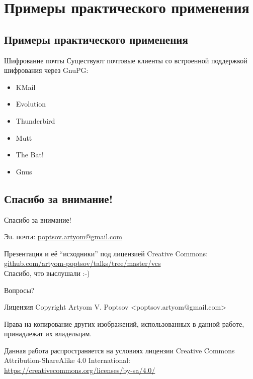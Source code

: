 \documentclass[presentation]{beamer}
\begin{document}

\section{Примеры практического применения}

\subsection{Примеры практического применения}

\begin{frame}[fragile]{Шифрование почты}
  Существуют почтовые клиенты со встроенной поддержкой шифрования
  через GnuPG:
  \begin{itemize}
  \item KMail
  \item Evolution
  \item Thunderbird
  \item Mutt
  \item The Bat!
  \item Gnus
  \end{itemize}
\end{frame}




\subsection{Спасибо за внимание!}

\begin{frame}{Спасибо за внимание!}
  \large

  Эл. почта: \url{poptsov.artyom@gmail.com}

  \medskip

  Презентация и её ``исходники'' под лицензией Creative Commons:
  \url{github.com/artyom-poptsov/talks/tree/master/vcs} \\[10pt]

  Спасибо, что выслушали  :-) \\[30pt]

  \bigskip

  \huge Вопросы?
\end{frame}

\begin{frame}{Лицензия}
  Copyright  Artyom V. Poptsov
  <poptsov.artyom@gmail.com> \newline

  Права на копирование других изображений, использованных в данной
  работе, принадлежат их владельцам. \newline

  Данная работа распространяется на условиях лицензии Creative Commons
  Attribution-ShareAlike 4.0 International:
  \url{https://creativecommons.org/licenses/by-sa/4.0/}
\end{frame}
\end{document}
